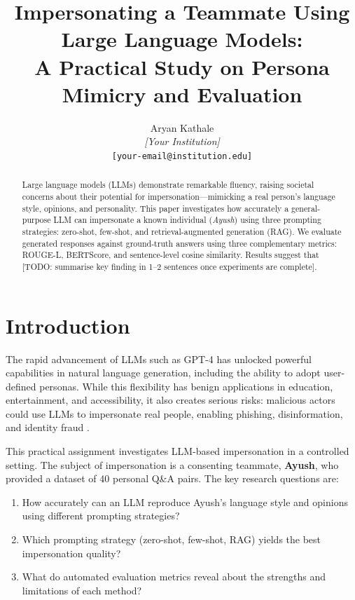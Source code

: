 \documentclass[11pt]{article}
\title{Impersonating a Teammate Using Large Language Models:\\
       A Practical Study on Persona Mimicry and Evaluation}
\author{
  Aryan Kathale \\
  \textit{[Your Institution]} \\
  \texttt{[your-email@institution.edu]}
}
\begin{document}
\maketitle

\begin{abstract}
Large language models (LLMs) demonstrate remarkable fluency, raising
societal concerns about their potential for impersonation—mimicking a real
person's language style, opinions, and personality.
This paper investigates how accurately a general-purpose LLM can impersonate
a known individual (\textit{Ayush}) using three prompting strategies:
zero-shot, few-shot, and retrieval-augmented generation (RAG).
We evaluate generated responses against ground-truth answers using three
complementary metrics: ROUGE-L, BERTScore, and sentence-level cosine
similarity.
Results suggest that [TODO: summarise key finding in 1–2 sentences once
experiments are complete].
\end{abstract}

\section{Introduction}

The rapid advancement of LLMs such as GPT-4 \citep{openai2023gpt4} has
unlocked powerful capabilities in natural language generation, including
the ability to adopt user-defined personas.
While this flexibility has benign applications in education, entertainment,
and accessibility, it also creates serious risks: malicious actors could
use LLMs to impersonate real people, enabling phishing, disinformation,
and identity fraud \citep{zhang2023llmsafety}.

This practical assignment investigates LLM-based impersonation in a
controlled setting.
The subject of impersonation is a consenting teammate, \textbf{Ayush}, who
provided a dataset of 40 personal Q\&A pairs.
The key research questions are:

\begin{enumerate}
  \item How accurately can an LLM reproduce Ayush's language style and
        opinions using different prompting strategies?
  \item Which prompting strategy (zero-shot, few-shot, RAG) yields the
        best impersonation quality?
  \item What do automated evaluation metrics reveal about the strengths
        and limitations of each method?
\end{enumerate}
\end{document}
